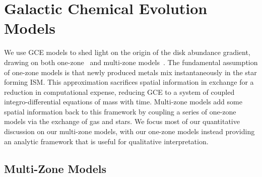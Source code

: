 
\section{Galactic Chemical Evolution Models}
\label{outflows:sec:gce}
We use GCE models to shed light on the origin of the disk abundance gradient,
drawing on both one-zone~\citep[e.g.,][]{Tinsley1980, Pagel2009, Matteucci2021}
and multi-zone models~\citep[e.g.,][]{Schoenrich2009a, Minchev2013,
Minchev2014, Chen2023}.
The fundamental assumption of one-zone models is that newly produced metals
mix instantaneously in the star forming ISM.
This approximation sacrifices spatial information in exchange for a reduction
in computational expense, reducing GCE to a system of coupled
integro-differential equations of mass with time.
Multi-zone models add some spatial information back to this framework by
coupling a series of one-zone models via the exchange of gas and stars.
We focus most of our quantitative discussion on our multi-zone models, with our
one-zone models instead providing an analytic framework that is useful for
qualitative interpretation.



\subsection{Multi-Zone Models}
\label{outflows:sec:gce:multizone}

